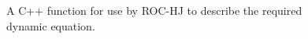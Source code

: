 \documentclass[11pt]{amsart}
\begin{document}
\begin{figure}
    \centering
    \inputminted[frame=lines,
        framesep=2mm,
        baselinestretch=1.2,
        fontsize=\footnotesize,
        firstline=133, 
        lastline=154]{c}{code/data.h}
    \caption{A C++ function for use by ROC-HJ to describe the required
             dynamic equation.}
    \label{code:dynamic}
\end{figure}

\hspace{1in}

\noindent
\end{document}
